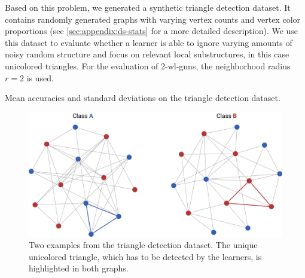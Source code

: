 Based on this problem, we generated a synthetic triangle detection dataset.
It contains randomly generated graphs with varying vertex counts and vertex color proportions (see \cref{sec:appendix:ds-stats} for a more detailed description).
We use this dataset to evaluate whether a learner is able to ignore varying amounts of noisy random structure and focus on relevant local substructures, in this case unicolored triangles.
For the evaluation of 2-\acs{wl}-\acsp{gnn}, the neighborhood radius $r = 2$ is used.
\begin{table}[t]
	\caption{Mean accuracies and standard deviations on the triangle detection dataset.}\label{tbl:eval:synthetic}
	\centering
\end{table}
\begin{figure}[t]
	\centering
	\includegraphics[width=0.7\linewidth]{gfx/evaluation/triangle-problem.pdf}
	\caption[Two example graphs from the triangle detection dataset.]{
		Two examples from the triangle detection dataset.
		The unique unicolored triangle, which has to be detected by the learners, is highlighted in both graphs.
	}\label{fig:evaluation:triangle-problem}
\end{figure}

